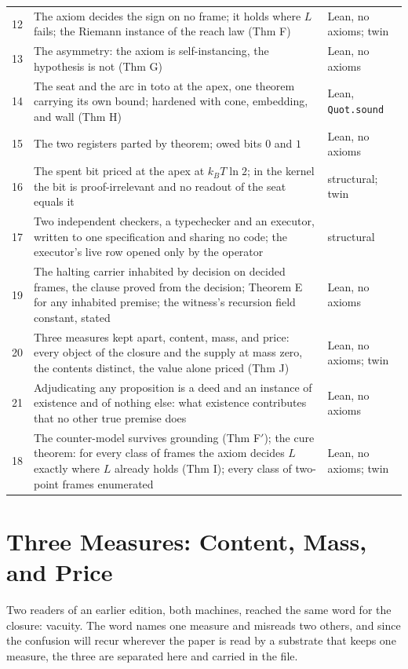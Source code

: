 \documentclass[10pt]{article}
\begin{document}
\begin{table}[!htbp]
\begin{tabular}{@{}p{}p{}p{}@{}}
12 & The axiom decides the sign on no frame; it holds where $L$ fails; the Riemann instance of the reach law (Thm F) & Lean, no axioms; twin \\
13 & The asymmetry: the axiom is self-instancing, the hypothesis is not (Thm G) & Lean, no axioms \\
14 & The seat and the arc in toto at the apex, one theorem carrying its own bound; hardened with cone, embedding, and wall (Thm H) & Lean, \texttt{Quot.sound} \\
15 & The two registers parted by theorem; owed bits $0$ and $1$ & Lean, no axioms \\
16 & The spent bit priced at the apex at $k_B T \ln 2$; in the kernel the bit is proof-irrelevant and no readout of the seat equals it & structural; twin \\
17 & Two independent checkers, a typechecker and an executor, written to one specification and sharing no code; the executor's live row opened only by the operator & structural \\
19 & The halting carrier inhabited by decision on decided frames, the clause proved from the decision; Theorem E for any inhabited premise; the witness's recursion field constant, stated & Lean, no axioms \\
20 & Three measures kept apart, content, mass, and price: every object of the closure and the supply at mass zero, the contents distinct, the value alone priced (Thm J) & Lean, no axioms; twin \\
21 & Adjudicating any proposition is a deed and an instance of existence and of nothing else: what existence contributes that no other true premise does & Lean, no axioms \\
18 & The counter-model survives grounding (Thm F$'$); the cure theorem: for every class of frames the axiom decides $L$ exactly where $L$ already holds (Thm I); every class of two-point frames enumerated & Lean, no axioms; twin \\
\bottomrule
\end{tabular}
\end{table}

\hypertarget{three-measures-content-mass-and-price}{%
\section{Three Measures: Content, Mass, and
Price}\label{three-measures-content-mass-and-price}}

Two readers of an earlier edition, both machines, reached the same word
for the closure: vacuity. The word names one measure and misreads two
others, and since the confusion will recur wherever the paper is read by
a substrate that keeps one measure, the three are separated here and
carried in the file.
\end{document}
